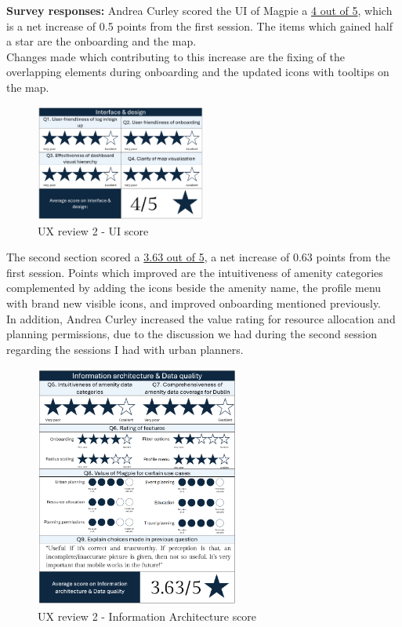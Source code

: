 \newpage
\noindent \textbf{Survey responses:}
Andrea Curley scored the UI of Magpie a \underline{4 out of 5}, which is a net increase of 0.5 points from the first session. The items which gained half a star are the onboarding and the map.\\
Changes made which contributing to this increase are the fixing of the overlapping elements during onboarding and the updated icons with tooltips on the map.\\
\begin{figure}[h!]
    \centering
    \includegraphics[width=0.5\textwidth]{images/ux-survey2-ui.png}
    \caption{UX review 2 - UI score}
\end{figure}

\noindent The second section scored a \underline{3.63 out of 5}, a net increase of 0.63 points from the first session. Points which improved are the intuitiveness of amenity categories complemented by adding the icons beside the amenity name, the profile menu with brand new visible icons, and improved onboarding mentioned previously.\\
In addition, Andrea Curley increased the value rating for resource allocation and planning permissions, due to the discussion we had during the second session regarding the sessions I had with urban planners. \\
\begin{figure}[h!]
    \centering
    \includegraphics[width=0.6\textwidth]{images/ux-survey2-data.png}
    \caption{UX review 2 - Information Architecture score}
\end{figure}

